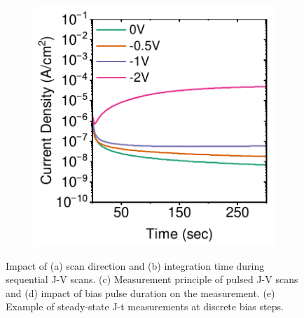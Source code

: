 \begin{figure}[ht!]
    \begin{subfigure}[b]{0.35\textwidth}
        \centering
        \includegraphics[width=\textwidth]{chapters/material_properties/images/Steady-State-plot.pdf}
        \caption{}
        \label{fig:ch2:steady_state}
    \end{subfigure}

    \caption{Impact of (a) scan direction and (b) integration time during sequential J-V scans. (c) Measurement principle of pulsed J-V scans and (d) impact of bias pulse duration on the measurement. (e) Example of steady-state J-t measurements at discrete bias steps.}
    \label{fig:ch2:types_of_measurement}
\end{figure}


